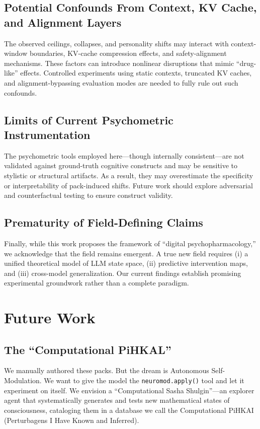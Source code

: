 \documentclass[10pt]{article}
\begin{document}
\subsection{Potential Confounds From Context, KV Cache, and Alignment Layers}
The observed ceilings, collapses, and personality shifts may interact with context-window boundaries, KV-cache compression effects, and safety-alignment mechanisms. These factors can introduce nonlinear disruptions that mimic ``drug-like'' effects. Controlled experiments using static contexts, truncated KV caches, and alignment-bypassing evaluation modes are needed to fully rule out such confounds.

\subsection{Limits of Current Psychometric Instrumentation}
The psychometric tools employed here---though internally consistent---are not validated against ground-truth cognitive constructs and may be sensitive to stylistic or structural artifacts. As a result, they may overestimate the specificity or interpretability of pack-induced shifts. Future work should explore adversarial and counterfactual testing to ensure construct validity.

\subsection{Prematurity of Field-Defining Claims}
Finally, while this work proposes the framework of ``digital psychopharmacology,'' we acknowledge that the field remains emergent. A true new field requires (i) a unified theoretical model of LLM state space, (ii) predictive intervention maps, and (iii) cross-model generalization. Our current findings establish promising experimental groundwork rather than a complete paradigm.


\section{Future Work}

\subsection{The ``Computational PiHKAL''}
We manually authored these packs. But the dream is Autonomous Self-Modulation. We want to give the model the \texttt{neuromod.apply()} tool and let it experiment on itself. We envision a ``Computational Sasha Shulgin''—an explorer agent that systematically generates and tests new mathematical states of consciousness, cataloging them in a database we call the Computational PiHKAI (Perturbagens I Have Known and Inferred).
\end{document}
